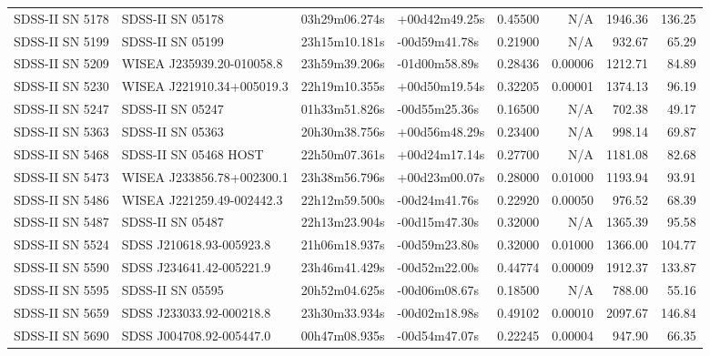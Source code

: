 \begin{longtable}{llllrrrr}
SDSS-II SN 5178  &                SDSS-II SN 05178 &   03h29m06.274s &   +00d42m49.25s &  0.45500 &      N/A &  1946.36 &      136.25 \\
SDSS-II SN 5199  &                SDSS-II SN 05199 &   23h15m10.181s &   -00d59m41.78s &  0.21900 &      N/A &   932.67 &       65.29 \\
SDSS-II SN 5209  &       WISEA J235939.20-010058.8 &   23h59m39.206s &   -01d00m58.89s &  0.28436 &  0.00006 &  1212.71 &       84.89 \\
SDSS-II SN 5230  &       WISEA J221910.34+005019.3 &   22h19m10.355s &   +00d50m19.54s &  0.32205 &  0.00001 &  1374.13 &       96.19 \\
SDSS-II SN 5247  &                SDSS-II SN 05247 &   01h33m51.826s &   -00d55m25.36s &  0.16500 &      N/A &   702.38 &       49.17 \\
SDSS-II SN 5363  &                SDSS-II SN 05363 &   20h30m38.756s &   +00d56m48.29s &  0.23400 &      N/A &   998.14 &       69.87 \\
SDSS-II SN 5468  &           SDSS-II SN 05468 HOST &   22h50m07.361s &   +00d24m17.14s &  0.27700 &      N/A &  1181.08 &       82.68 \\
SDSS-II SN 5473  &       WISEA J233856.78+002300.1 &   23h38m56.796s &   +00d23m00.07s &  0.28000 &  0.01000 &  1193.94 &       93.91 \\
SDSS-II SN 5486  &       WISEA J221259.49-002442.3 &   22h12m59.500s &   -00d24m41.76s &  0.22920 &  0.00050 &   976.52 &       68.39 \\
SDSS-II SN 5487  &                SDSS-II SN 05487 &   22h13m23.904s &   -00d15m47.30s &  0.32000 &      N/A &  1365.39 &       95.58 \\
SDSS-II SN 5524  &        SDSS J210618.93-005923.8 &   21h06m18.937s &   -00d59m23.80s &  0.32000 &  0.01000 &  1366.00 &      104.77 \\
SDSS-II SN 5590  &        SDSS J234641.42-005221.9 &   23h46m41.429s &   -00d52m22.00s &  0.44774 &  0.00009 &  1912.37 &      133.87 \\
SDSS-II SN 5595  &                SDSS-II SN 05595 &   20h52m04.625s &   -00d06m08.67s &  0.18500 &      N/A &   788.00 &       55.16 \\
SDSS-II SN 5659  &        SDSS J233033.92-000218.8 &   23h30m33.934s &   -00d02m18.98s &  0.49102 &  0.00010 &  2097.67 &      146.84 \\
SDSS-II SN 5690  &        SDSS J004708.92-005447.0 &   00h47m08.935s &   -00d54m47.07s &  0.22245 &  0.00004 &   947.90 &       66.35 \\

\end{longtable}
